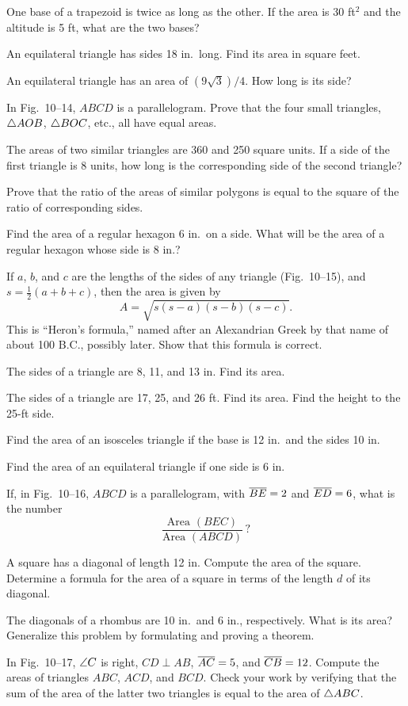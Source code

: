 \documentclass[11pt]{book}
\begin{document}
\begin{exercisecols}
\begin{exlist}
\item One base of a trapezoid is twice as long as the other. If the area is
  30 ft$^2$ and the altitude is 5 ft, what are the two bases?
\item An equilateral triangle has sides 18 in.\ long. Find its area in square
  feet.
\item An equilateral triangle has an area of $(9\sqrt{3})/4$. How long is its
  side?
\item In Fig.~10--14, $ABCD$ is a parallelogram. Prove that the four small
  triangles, $\triangle AOB$, $\triangle BOC$, etc., all have equal areas.
\exfig{\FIGXFOURTEEN}
\item The areas of two similar triangles are 360 and 250 square units. If a
  side of the first triangle is 8 units, how long is the corresponding side of
  the second triangle?
\item[\stex 28.] Prove that the ratio of the areas of similar polygons is equal
  to the square of the ratio of corresponding sides.
\item[29.] Find the area of a regular hexagon 6 in.\ on a side. What will be
  the area of a regular hexagon whose side is 8 in.?
\item[\stex 30.] If $a$, $b$, and $c$ are the lengths of the sides of any
  triangle (Fig.~10--15), and $s = \frac{1}{2}(a + b + c)$, then the area is
  given by
  \[ A = \sqrt{s(s\!-\!a)(s\!-\!b)(s\!-\!c)}. \]
  This is ``Heron's formula,'' named after an Alexandrian Greek by that name of
  about 100 B.C., possibly later. Show that this formula is correct.
\exfig{\FIGXFIFTEEN}
\item[31.] The sides of a triangle are 8, 11, and 13 in. Find its area.
\item[32.] The sides of a triangle are 17, 25, and 26 ft. Find its area. Find
  the height to the 25-ft side.
\item[33.] Find the area of an isosceles triangle if the base is 12 in.\ and
  the sides 10 in.
\item[34.] Find the area of an equilateral triangle if one side is 6 in.
\item[35.] If, in Fig.~10--16, $ABCD$ is a parallelogram, with $\overline{BE} = 2$
  and $\overline{ED} = 6$, what is the number
  \[ \frac{\text{Area } (BEC)}{\text{Area } (ABCD)}\,? \]
\exfig{\FIGXSIXTEEN}
\item[36.] A square has a diagonal of length 12 in. Compute the area of the
  square. Determine a formula for the area of a square in terms of the length
  $d$ of its diagonal.
\item[37.] The diagonals of a rhombus are 10 in.\ and 6 in., respectively. What
  is its area? Generalize this problem by formulating and proving a theorem.
\item[38.] In Fig.~10--17, $\angle C$ is right, $CD \perp AB$, $\overline{AC} = 5$,
  and $\overline{CB} = 12$. Compute the areas of triangles $ABC$, $ACD$, and $BCD$.
  Check your work by verifying that the sum of the area of the latter two
  triangles is equal to the area of $\triangle ABC$.
\exfig{\FIGXSEVENTEEN}
\end{exlist}
\end{exercisecols}
\end{document}
